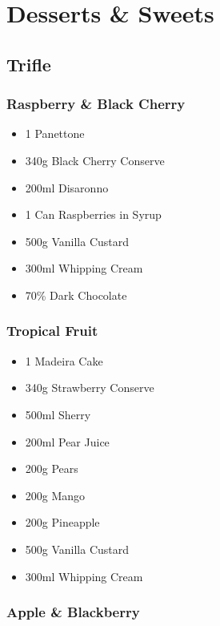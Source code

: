 \documentclass[11pt, english]{article}
\begin{document}
\section{Desserts \& Sweets}

	\subsection{Trifle}

		\subsubsection*{Raspberry \& Black Cherry}

	\begin{itemize}
        \setlength\itemsep{0cm}
                \item 1 Panettone
		\item 340g Black Cherry Conserve
		\item 200ml Disaronno
		\item 1 Can Raspberries in Syrup
		\item 500g Vanilla Custard
		\item 300ml Whipping Cream
		\item 70\% Dark Chocolate 
        \end{itemize}		

		\subsubsection*{Tropical Fruit}

	\begin{itemize}
        \setlength\itemsep{0cm}
                \item 1 Madeira Cake
		\item 340g Strawberry Conserve
		\item 500ml Sherry
		\item 200ml Pear Juice
		\item 200g Pears
		\item 200g Mango
		\item 200g Pineapple
		\item 500g Vanilla Custard
		\item 300ml Whipping Cream
        \end{itemize}

		\subsubsection*{Apple \& Blackberry}
\end{document}
